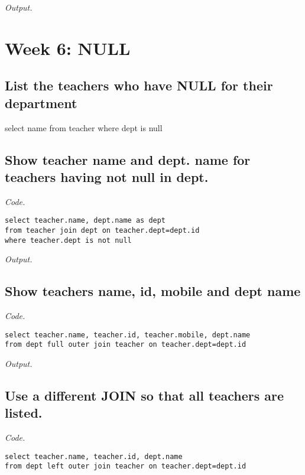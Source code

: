 \documentclass[12pt]{article}
\begin{document}
\textit{Output.}\\

\section{Week 6: NULL}

\subsection{List the teachers who have NULL for their department}

select name from teacher
where dept is null

\subsection{Show teacher name and dept. name for teachers having not null in dept.}

\textit{Code.}

\begin{lstlisting}[showstringspaces=false]
select teacher.name, dept.name as dept
from teacher join dept on teacher.dept=dept.id
where teacher.dept is not null
\end{lstlisting}

\textit{Output.}\\

\subsection{Show teachers name, id, mobile and dept name}

\textit{Code.}

\begin{lstlisting}[showstringspaces=false]
select teacher.name, teacher.id, teacher.mobile, dept.name 
from dept full outer join teacher on teacher.dept=dept.id
\end{lstlisting}

\textit{Output.}\\

\subsection{Use a different JOIN so that all teachers are listed.}

\textit{Code.}

\begin{lstlisting}[showstringspaces=false]
select teacher.name, teacher.id, dept.name 
from dept left outer join teacher on teacher.dept=dept.id
\end{lstlisting}
\end{document}
